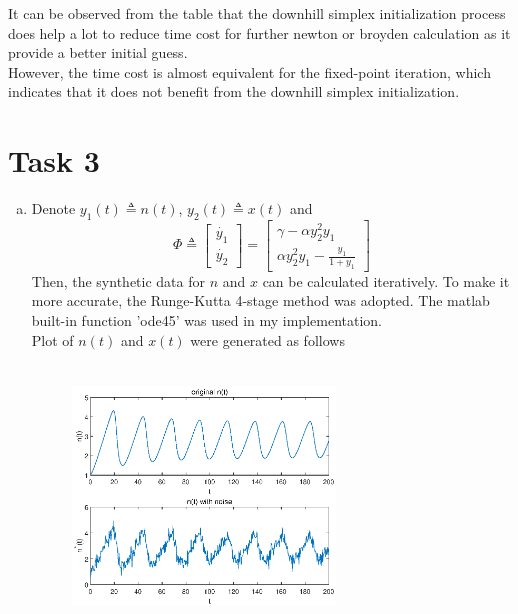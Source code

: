 \documentclass[paper=a4, fontsize=11pt]{scrartcl} %
\numberwithin{equation}{section} %
\numberwithin{figure}{section} %
\numberwithin{table}{section} %
\begin{document}
		It can be observed from the table that the downhill simplex initialization process does help a lot to reduce time cost for further newton or broyden calculation as it provide a better initial guess. \\
		However, the time cost is almost equivalent for the fixed-point iteration, which indicates that it does not benefit from the downhill simplex initialization. 

\section{Task 3}
	\begin{enumerate}[(a)]
		\item 
			Denote $y_1(t) \triangleq n(t)$, $y_2(t) \triangleq x(t)$ and
			\begin{equation}
				\Phi \triangleq
				\begin{bmatrix}
					\dot{y_1}\\
					 \dot{y_2}	
				\end{bmatrix}
				=
				\begin{bmatrix}
					\gamma - \alpha y_2^2 y_1\\
					\alpha y_2^2 y_1 - \frac{y_1}{1+y_1}
				\end{bmatrix}
			\end{equation}
			Then, the synthetic data for $n$ and $x$ can be calculated iteratively. To make it more accurate, the Runge-Kutta 4-stage method was adopted. The matlab built-in function 'ode45' was used in my implementation. \\
			Plot of $n(t)$ and $x(t)$ were generated as follows
			\begin{figure}[htbp]\centering
				\begin{minipage}{7.5cm}
					\centering
					\includegraphics[height=7cm,width=7cm]{../pic/n_and_ns.eps}
				\end{minipage}%

\end{figure}
\end{enumerate}
\end{document}
